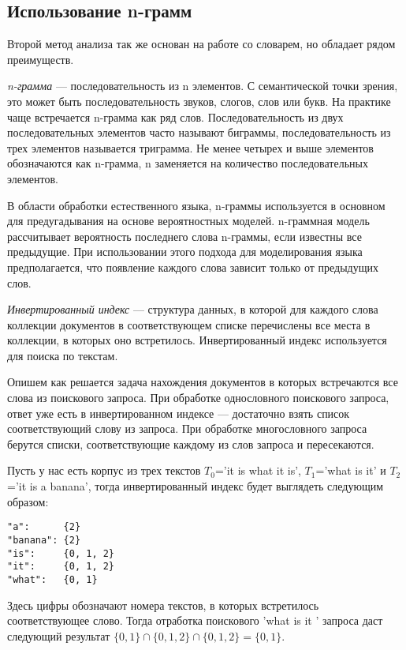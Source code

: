 \subsection{Использование n-грамм}

Второй метод анализа так же основан на работе со словарем, 
но обладает рядом преимуществ.

\DEF\textit{n-грамма} — последовательность из n элементов. С 
семантической точки зрения, это может быть последовательность 
звуков, слогов, слов или букв. На практике чаще встречается 
n-грамма как ряд слов. Последовательность из двух последовательных 
элементов часто называют биграммы, последовательность из трех 
элементов называется триграмма. Не менее четырех и выше элементов 
обозначаются как n-грамма, n заменяется на количество последовательных 
элементов.

В области обработки естественного языка, n-граммы используется 
в основном для предугадывания на основе вероятностных моделей. 
n-граммная модель рассчитывает вероятность последнего слова 
n-граммы, если известны все предыдущие. При использовании этого 
подхода для моделирования языка предполагается, что появление 
каждого слова зависит только от предыдущих слов.

\DEF\textit{Инвертированный индекс} — структура данных, в которой 
для каждого слова коллекции документов в соответствующем списке 
перечислены все места в коллекции, в которых оно встретилось. 
Инвертированный индекс используется для поиска по текстам.

Опишем как решается задача нахождения документов в которых встречаются 
все слова из поискового запроса. При обработке однословного поискового 
запроса, ответ уже есть в инвертированном индексе — достаточно 
взять список соответствующий слову из запроса. При обработке 
многословного запроса берутся списки, соответствующие каждому 
из слов запроса и пересекаются.

Пусть у нас есть корпус из трех текстов $T_0$='it is what it is', 
$T_1$='what is it' и $T_2$='it is a banana', тогда инвертированный 
индекс будет выглядеть следующим образом:

\begin{verbatim}
"a":      {2}
"banana": {2}
"is":     {0, 1, 2}
"it":     {0, 1, 2}
"what":   {0, 1}
\end{verbatim}

Здесь цифры обозначают номера текстов, в которых встретилось 
соответствующее слово. Тогда отработка поискового 'what is it
' запроса даст следующий результат $\{0,1\} \cap \{0,1,2\} \cap 
\{0,1,2\} = \{0,1\}$.

